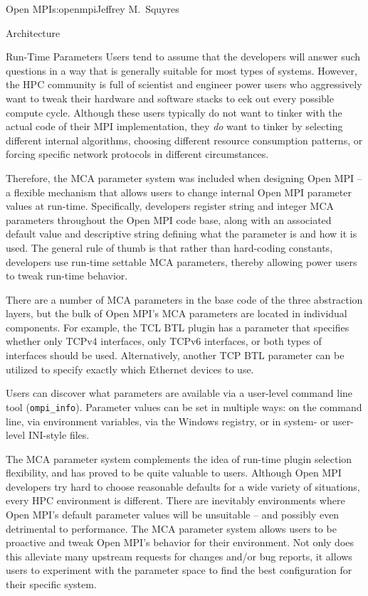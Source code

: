 \begin{aosachapter}{Open MPI}{s:openmpi}{Jeffrey M.\ Squyres}
\begin{aosasect1}{Architecture}
\begin{aosasect2}{Run-Time Parameters}
Users tend to assume that the developers will answer such questions in
a way that is generally suitable for most types of systems.
%
However, the HPC community is full of scientist and engineer power
users who aggressively want to tweak their hardware and software
stacks to eek out every possible compute cycle.
%
Although these users typically do not want to tinker with the actual
code of their MPI implementation, they \emph{do} want to tinker by
selecting different internal algorithms, choosing different resource
consumption patterns, or forcing specific network protocols in
different circumstances.

Therefore, the MCA parameter system was included when designing Open
MPI -- a flexible mechanism that allows users to change internal Open
MPI parameter values at run-time.
%
Specifically, developers register string and integer MCA parameters
throughout the Open MPI code base, along with an associated default
value and descriptive string defining what the parameter is and how it
is used.
%
The general rule of thumb is that rather than hard-coding constants,
developers use run-time settable MCA parameters, thereby allowing
power users to tweak run-time behavior.

There are a number of MCA parameters in the base code of the three
abstraction layers, but the bulk of Open MPI's MCA parameters are
located in individual components.
%
For example, the TCL BTL plugin has a parameter that specifies whether
only TCPv4 interfaces, only TCPv6 interfaces, or both types of
interfaces should be used.
%
Alternatively, another TCP BTL parameter can be utilized to specify
exactly which Ethernet devices to use.

Users can discover what parameters are available via a user-level
command line tool ({\tt ompi\_\-info}).
%
Parameter values can be set in multiple ways: on the command line, via
environment variables, via the Windows registry, or in system- or
user-level INI-style files.

The MCA parameter system complements the idea of run-time plugin
selection flexibility, and has proved to be quite valuable to users.
%
Although Open MPI developers try hard to choose reasonable defaults
for a wide variety of situations, every HPC environment is different.
There are inevitably environments where Open MPI's default parameter
values will be unsuitable -- and possibly even detrimental to
performance.
%
The MCA parameter system allows users to be proactive and tweak Open
MPI's behavior for their environment.  Not only does this alleviate
many upstream requests for changes and/or bug reports, it allows users
to experiment with the parameter space to find the best configuration
for their specific system.


\end{aosasect2}
\end{aosasect1}
\end{aosachapter}
